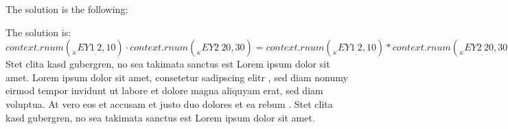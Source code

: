 The solution is the following:
\begin{Solution}
\solitem The solution is: ${{context.rnum(__KEY1__, 2, 10)}} \cdot {{context.rnum(__KEY2__, 20, 30)}} = {{context.rnum(__KEY1__, 2, 10) * context.rnum(__KEY2__, 20, 30)}}$
\solitem Stet clita kasd gubergren, no sea takimata sanctus est Lorem ipsum dolor sit amet. Lorem ipsum dolor sit amet, consetetur sadipscing elitr , sed diam nonumy eirmod tempor invidunt ut labore et dolore magna aliquyam erat, sed diam voluptua. 
\solitem At vero eos et accusam et justo duo dolores et ea rebum . Stet clita kasd gubergren, no sea takimata sanctus est Lorem ipsum dolor sit amet. 
\end{Solution}